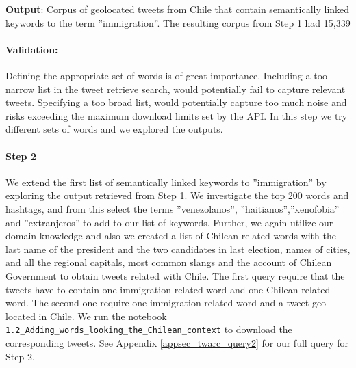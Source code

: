         
            \newline\indent
        \textbf{Output}: Corpus of geolocated tweets from Chile that contain semantically linked keywords to the term ''immigration''. The resulting corpus from Step 1 had 15,339
        
        \paragraph{Validation:} Defining the appropriate set of words is of great importance. Including a too narrow list in the tweet retrieve search, would potentially fail to capture relevant tweets. Specifying a too broad list, would potentially capture too much noise and risks exceeding the maximum download limits set by the API. In this step we try different sets of words and we explored the outputs.
    
    
        \paragraph{Step 2} 
        We extend the first list of semantically linked keywords to ''immigration'' by exploring the output retrieved from Step 1. We investigate the top 200 words and hashtags, and from this select the terms ''venezolanos'', ''haitianos'',''xenofobia'' and ''extranjeros'' to add to our list of keywords. Further, we again utilize our domain knowledge and also we created a list of Chilean related words with the last name of the president and the two candidates in last election, names of cities, and all the regional capitals, most common slangs and the account of Chilean Government to obtain tweets related with Chile. The first query require that the tweets have to contain one immigration related word and one Chilean related word. The second one require one immigration related word and a tweet geo-located in Chile. We run the notebook \texttt{1.2\_Adding\_words\_looking\_the\_Chilean\_context} to download the corresponding tweets. See Appendix \ref{appsec_twarc_query2} for our full query for Step 2.
        
